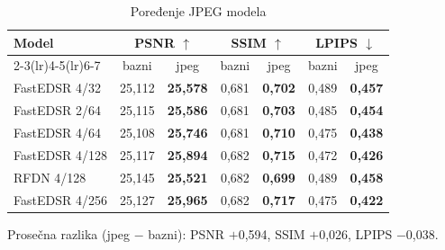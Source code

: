 \begin{table}[H]
    \begin{tabular}{lcccccc}
        \toprule
        Model & \multicolumn{2}{c}{PSNR $\uparrow$} & \multicolumn{2}{c}{SSIM $\uparrow$} & \multicolumn{2}{c}{LPIPS $\downarrow$} \\
        \cmidrule(lr){2-3}\cmidrule(lr){4-5}\cmidrule(lr){6-7}
         & bazni & jpeg & bazni & jpeg & bazni & jpeg \\
        \midrule
        FastEDSR 4/32 & 25,112 & \textbf{25,578} & 0,681 & \textbf{0,702} & 0,489 & \textbf{0,457} \\
        FastEDSR 2/64 & 25,115 & \textbf{25,586} & 0,681 & \textbf{0,703} & 0,485 & \textbf{0,454} \\
        FastEDSR 4/64 & 25,108 & \textbf{25,746} & 0,681 & \textbf{0,710} & 0,475 & \textbf{0,438} \\
        FastEDSR 4/128 & 25,117 & \textbf{25,894} & 0,682 & \textbf{0,715} & 0,472 & \textbf{0,426} \\
        RFDN 4/128 & 25,145 & \textbf{25,521} & 0,682 & \textbf{0,699} & 0,489 & \textbf{0,458} \\
        FastEDSR 4/256 & 25,127 & \textbf{25,965} & 0,682 & \textbf{0,717} & 0,475 & \textbf{0,422} \\
        \bottomrule
    \end{tabular}
    \caption{Poređenje JPEG modela}
    \label{tab:jpeg_4x_DIV2K_jpeg}
\end{table}

\noindent Prosečna razlika (jpeg $-$ bazni): PSNR $+$0,594, SSIM $+$0,026, LPIPS $-$0,038.